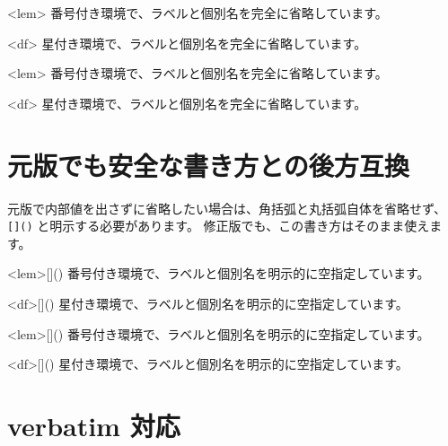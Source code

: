 \documentclass{ltjsarticle}
\begin{document}
\begin{codeblock}
\begin{statementsp}<lem>
番号付き環境で、ラベルと個別名を完全に省略しています。
\end{statementsp}

\begin{statementsp*}<df>
星付き環境で、ラベルと個別名を完全に省略しています。
\end{statementsp*}
\end{codeblock}

\begin{statementsp}<lem>
番号付き環境で、ラベルと個別名を完全に省略しています。
\end{statementsp}

\begin{statementsp*}<df>
星付き環境で、ラベルと個別名を完全に省略しています。
\end{statementsp*}

\section{元版でも安全な書き方との後方互換}

元版で内部値を出さずに省略したい場合は、角括弧と丸括弧自体を省略せず、
\texttt{[]()} と明示する必要があります。
修正版でも、この書き方はそのまま使えます。

\begin{codeblock}
\begin{statementsp}<lem>[]()
番号付き環境で、ラベルと個別名を明示的に空指定しています。
\end{statementsp}

\begin{statementsp*}<df>[]()
星付き環境で、ラベルと個別名を明示的に空指定しています。
\end{statementsp*}
\end{codeblock}

\begin{statementsp}<lem>[]()
番号付き環境で、ラベルと個別名を明示的に空指定しています。
\end{statementsp}

\begin{statementsp*}<df>[]()
星付き環境で、ラベルと個別名を明示的に空指定しています。
\end{statementsp*}

\section{verbatim 対応}
\end{document}
